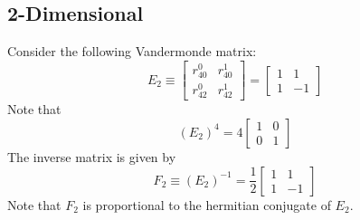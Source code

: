 \subsection{2-Dimensional}
Consider the following Vandermonde matrix:
\begin{equation}
    E_{2} \equiv \begin{bmatrix}
        r_{40}^{0} & r_{40}^{1} \\ r_{42}^{0} & r_{42}^{1}
    \end{bmatrix} = \begin{bmatrix}
        1 & 1 \\
        1 & -1
    \end{bmatrix}
    \label{eq.2.E2}
\end{equation}
Note that
\begin{equation}
    \left( E_{2} \right)^{4} = 4 \begin{bmatrix}
        1 & 0 \\
        0 & 1
    \end{bmatrix}
\end{equation}
The inverse matrix is given by
\begin{equation}
    F_{2} \equiv \left( E_{2} \right)^{-1} = \frac{1}{2} \begin{bmatrix}
        1 & 1 \\
        1 & -1
    \end{bmatrix}
    \label{eq.2.F2}
\end{equation}
Note that $F_{2}$ is proportional to the hermitian conjugate of $E_{2}$.
